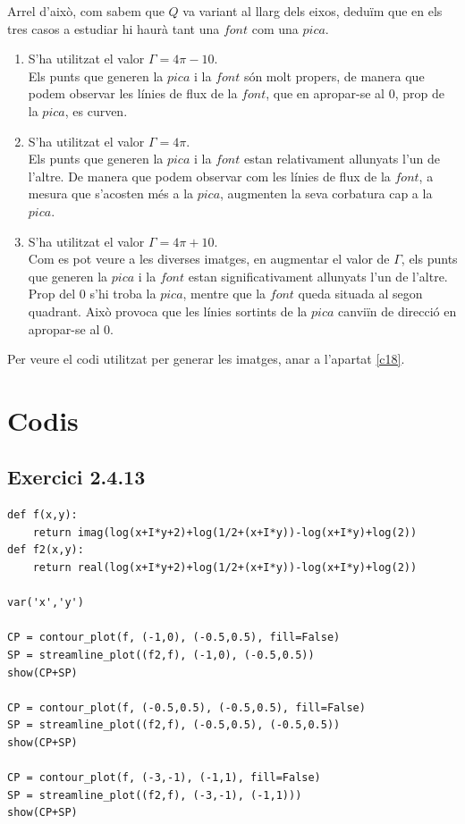 \documentclass[a4paper, 11pt]{article}
\begin{document}
Arrel d'això, com sabem que $Q$ va variant al llarg dels eixos, deduïm que en els tres casos a estudiar hi haurà tant una $font$ com una $pica$.
\begin{enumerate}[label=(\alph*)]
    \item S'ha utilitzat el valor $\Gamma = 4\pi-10$. 
    \\Els punts que generen la $pica$ i la $font$ són molt propers, de manera que podem observar les línies de flux de la $font$, que en apropar-se al $0$, prop de la $pica$, es curven.
    
     \item S'ha utilitzat el valor $\Gamma = 4\pi$. 
     \\Els punts que generen la $pica$ i la $font$ estan relativament allunyats l'un de l'altre. De manera que podem observar com les línies de flux de la $font$, a mesura que s'acosten més a la $pica$, augmenten la seva corbatura cap a la $pica$.
     
    \item S'ha utilitzat el valor $\Gamma = 4\pi+10$. 
    \\Com es pot veure a les diverses imatges, en augmentar el valor de $\Gamma$, els punts que generen la $pica$ i la $font$ estan significativament allunyats l'un de l'altre. Prop del $0$ s'hi troba la $pica$, mentre que la $font$ queda situada al segon quadrant. Això provoca que les línies sortints de la $pica$ canviïn de direcció en apropar-se al $0$.
\end{enumerate}
Per veure el codi utilitzat per generar les imatges, anar a l'apartat \textcolor{blue}{\ref{c18}}.\\

\newpage
\section{Codis}
\subsection{Exercici 2.4.13}
\hline
\begin{lstlisting}
def f(x,y):
    return imag(log(x+I*y+2)+log(1/2+(x+I*y))-log(x+I*y)+log(2))
def f2(x,y):
    return real(log(x+I*y+2)+log(1/2+(x+I*y))-log(x+I*y)+log(2))
    
var('x','y')

CP = contour_plot(f, (-1,0), (-0.5,0.5), fill=False)
SP = streamline_plot((f2,f), (-1,0), (-0.5,0.5))
show(CP+SP)

CP = contour_plot(f, (-0.5,0.5), (-0.5,0.5), fill=False)
SP = streamline_plot((f2,f), (-0.5,0.5), (-0.5,0.5))
show(CP+SP)

CP = contour_plot(f, (-3,-1), (-1,1), fill=False)
SP = streamline_plot((f2,f), (-3,-1), (-1,1)))
show(CP+SP)
\end{lstlisting}\label{c13}
\hline
\vspace{4em}
\end{document}
